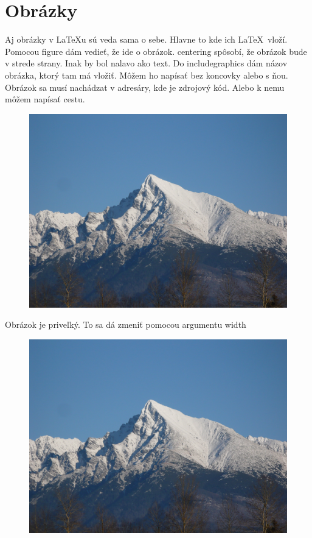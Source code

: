 \documentclass[11pt, a4paper]{article}
\begin{document}
\section{Obrázky}
Aj obrázky v \LaTeX u sú veda sama o sebe. Hlavne to kde ich \LaTeX\ vloží. Pomocou figure dám vedieť, že ide o obrázok. centering spôsobí, že obrázok bude v strede strany. Inak by bol nalavo ako text. Do includegraphics dám názov obrázka, ktorý tam má vložiť. Môžem ho napísať bez koncovky alebo s ňou. Obrázok sa musí nachádzat v adresáry, kde je zdrojový kód. Alebo k nemu môžem napísať cestu.
\begin{figure}
  \centering
      \includegraphics{krivan}
\end{figure}

Obrázok je priveľký. To sa dá zmeniť pomocou argumentu width
\begin{figure}
  \centering
      \includegraphics[width=1.\textwidth]{krivan}
\end{figure}
\end{document}
